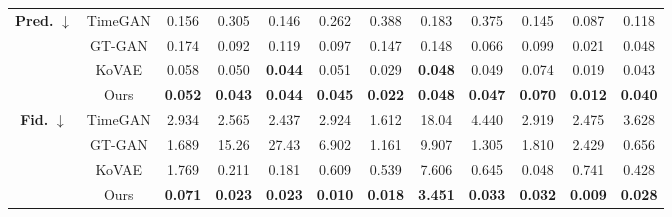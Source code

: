 \documentclass{article}
\theoremstyle{plain}
\theoremstyle{definition}
\theoremstyle{remark}
\begin{document}
{\begin{table*}[!t]
{\begin{tabular}{cc|cccccccccc}
    \multirow{4}{*}{\textbf{Pred.} $\downarrow$} 
      & TimeGAN 
         & 0.156 
         & 0.305 
         & 0.146 
         & 0.262 
         & 0.388 
         & 0.183 
         & 0.375 
         & 0.145 
         & 0.087 
         & 0.118 \\
      & GT-GAN  
         & 0.174 
         & 0.092 
         & 0.119 
         & 0.097 
         & 0.147 
         & 0.148 
         & 0.066 
         & 0.099 
         & 0.021 
         & 0.048 \\
      & KoVAE   
         & 0.058 
         & 0.050 
         & \cellcolor{blue!10}\textbf{0.044} 
         & 0.051 
         & 0.029 
         & \cellcolor{blue!10}\textbf{0.048} 
         & 0.049 
         & 0.074 
         & 0.019 
         & 0.043 \\
      & Ours    
         & \cellcolor{blue!10}\textbf{0.052} 
         & \cellcolor{blue!10}\textbf{0.043} 
         & \cellcolor{blue!10}\textbf{0.044} 
         & \cellcolor{blue!10}\textbf{0.045}
         & \cellcolor{blue!10}\textbf{0.022} 
         & \cellcolor{blue!10}\textbf{0.048} 
         & \cellcolor{blue!10}\textbf{0.047} 
         & \cellcolor{blue!10}\textbf{0.070} 
         & \cellcolor{blue!10}\textbf{0.012} 
         & \cellcolor{blue!10}\textbf{0.040} \\
    \midrule

    \multirow{4}{*}{\textbf{Fid.} $\downarrow$} 
      & TimeGAN 
         & 2.934 
         & 2.565 
         & 2.437 
         & 2.924 
         & 1.612 
         & 18.04 
         & 4.440 
         & 2.919 
         & 2.475 
         & 3.628 \\
      & GT-GAN  
         & 1.689 
         & 15.26 
         & 27.43 
         & 6.902 
         & 1.161 
         & 9.907 
         & 1.305 
         & 1.810 
         & 2.429 
         & 0.656 \\
      & KoVAE   
         & 1.769 
         & 0.211 
         & 0.181 
         & 0.609 
         & 0.539 
         & 7.606 
         & 0.645 
         & 0.048 
         & 0.741 
         & 0.428 \\
      & Ours    
         & \cellcolor{blue!10}\textbf{0.071} 
         & \cellcolor{blue!10}\textbf{0.023}
         & \cellcolor{blue!10}\textbf{0.023}
         & \cellcolor{blue!10}\textbf{0.010}
         & \cellcolor{blue!10}\textbf{0.018}
         & \cellcolor{blue!10}\textbf{3.451} 
         & \cellcolor{blue!10}\textbf{0.033}
         & \cellcolor{blue!10}\textbf{0.032}
         & \cellcolor{blue!10}\textbf{0.009}
         & \cellcolor{blue!10}\textbf{0.028} \\
    \midrule


\end{tabular}}
\end{table*}}
\end{document}
